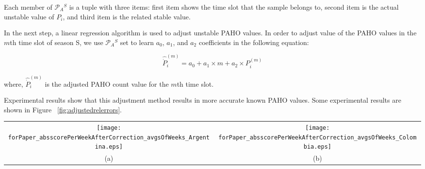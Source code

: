 Each member of $\mathcal{P}_A{^S}$ is a tuple with three items: first item shows the time slot that the sample belongs to, second item is the actual unstable value of $P_i$, and third item is the related stable value.

In the next step, a linear regression algorithm is used to adjust unstable PAHO values. In order to adjust value of the PAHO values in the $m$th time slot of season S, we use $\mathcal{P}_A{^S}$ set to learn $a_0$, $a_1$, and $a_2$ coefficients in the following equation:

\begin{equation}
\hat{\dot{P}}_i^{(m)} = a_0 + a_1 \times m + a_2 \times P_i^{(m)}
\end{equation}

where, $\hat{\dot{P}}_i^{(m)}$ is the adjusted PAHO count value for the $m$th time slot.

Experimental results show that this adjustment method results in more accurate known PAHO values. Some experimental results are shown in Figure ~\ref{fig:adjustedrelerrors}.

\begin{figure*}[h]
  \centering
   \begin{tabular}{cc}
     \texttt{[image: forPaper\_absscorePerWeekAfterCorrection\_avgsOfWeeks\_Argentina.eps]} &
     \texttt{[image: forPaper\_absscorePerWeekAfterCorrection\_avgsOfWeeks\_Colombia.eps]} \\
      (a) & (b) \\ %
  \end{tabular}
  \caption{Average absolute relative error of PAHO count values with respect to stable values before and after adjustment.
  (a) Argentina,
  (b) and Colombia.
  }
  \label{fig:adjustedrelerrors}

\end{figure*}



